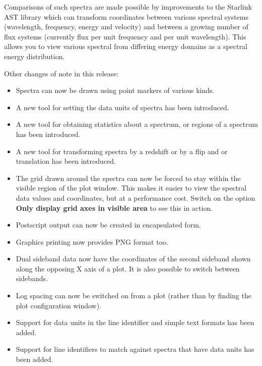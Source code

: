 \documentclass[twoside,11pt]{article}
\renewcommand{\_}{\texttt{\symbol{95}}}
\newcommand{\labelitem}[1]{\textbf{#1}}
\begin{document}
Comparisons of such spectra are made possible by improvements to the
Starlink AST library which can transform coordinates between various
spectral systems (wavelength, frequency, energy and velocity) and between a
growing number of flux systems (currently flux per unit frequency and per
unit wavelength). This allows you to view various spectral from differing
energy domains as a spectral energy distribution.

Other changes of note in this release:
\begin{itemize}
\item Spectra can now be drawn using point markers of various kinds.

\item A new tool for setting the data units of spectra has been introduced.

\item A new tool for obtaining statistics about a spectrum, or regions of a
      spectrum has been introduced.

\item A new tool for transforming spectra by a redshift or by a flip and or
      translation has been introduced.

\item The grid drawn around the spectra can now be forced to stay within
      the visible region of the plot window. This makes it easier to view
      the spectral data values and coordinates, but at a performance cost.
      Switch on the option \labelitem{Only display grid axes in visible area}
      to see this in action.

\item Postscript output can now be created in encapsulated form.

\item Graphics printing now provides PNG format too.

\item Dual sideband data now have the coordinates of the second sideband
      shown along the opposing X axis of a plot. It is also possible to
      switch between sidebands.

\item Log spacing can now be switched on from a plot (rather than by finding
      the plot configuration window).

\item Support for data units in the line identifier and simple text formats
      has been added.

\item Support for line identifiers to match against spectra that have data
      units has been added.


\end{itemize}
\end{document}
